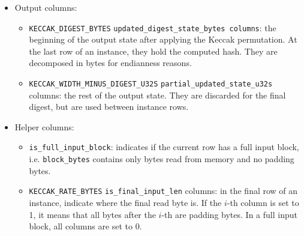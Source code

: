 \begin{itemize}
\begin{itemize}
    \end{itemize}
    \item Output columns:
    \begin{itemize}
        \item \texttt{KECCAK\_DIGEST\_BYTES} \texttt{updated\_digest\_state\_bytes columns}: the beginning of the output state after applying the Keccak permutation. At the last row of an instance, they hold the computed hash.
They are decomposed in bytes for endianness reasons.
        \item \texttt{KECCAK\_WIDTH\_MINUS\_DIGEST\_U32S} \texttt{partial\_updated\_state\_u32s} columns: the rest of the output state. They are discarded for the final digest, but are used between instance rows.
    \end{itemize}
    \item Helper columns:
    \begin{itemize}
        \item \texttt{is\_full\_input\_block}: indicates if the current row has a full input block, i.e. \texttt{block\_bytes} contains only bytes read from memory and no padding bytes.
        \item \texttt{KECCAK\_RATE\_BYTES} \texttt{is\_final\_input\_len} columns: in the final row of an instance, indicate where the final read byte is. If the $i$-th column is set to 1, it means that
all bytes after the $i$-th are padding bytes. In a full input block, all columns are set to 0. 
    \end{itemize}
\end{itemize}

